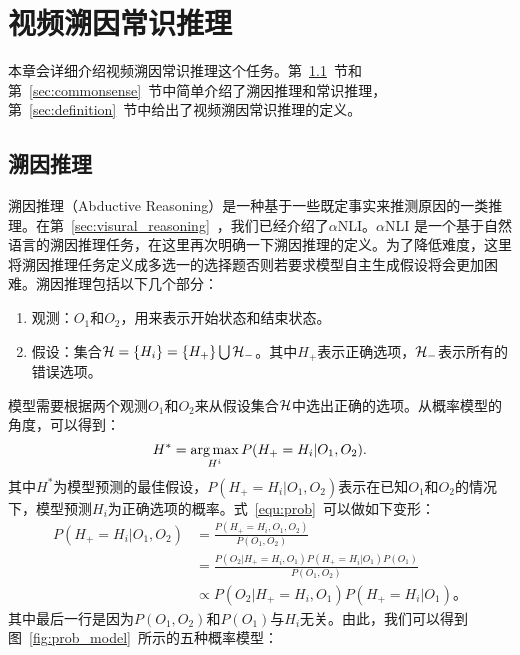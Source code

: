 
\chapter{视频溯因常识推理}\label{cha:vacr}
本章会详细介绍视频溯因常识推理这个任务。第~\ref{sec:abductive}~节和第~\ref{sec:commonsense}~节中简单介绍了溯因推理和常识推理，第~\ref{sec:definition}~节中给出了视频溯因常识推理的定义。
\section{溯因推理}\label{sec:abductive}
溯因推理（Abductive Reasoning）是一种基于一些既定事实来推测原因的一类推理。在第~\ref{sec:visural_reasoning}~，我们已经介绍了$\alpha$NLI\cite{bhagavatula2019abductive}。$\alpha$NLI 是一个基于自然语言的溯因推理任务，在这里再次明确一下溯因推理的定义。为了降低难度，这里将溯因推理任务定义成多选一的选择题否则若要求模型自主生成假设将会更加困难。溯因推理包括以下几个部分：
\begin{enumerate}
    \item 观测：$O_1$和$O_2$，用来表示开始状态和结束状态。
    \item 假设：集合${\mathcal{H}}=\{H_i\}=\{H_+\}\bigcup{\mathcal{H}}_{-}$。其中$H_+$表示正确选项，${\mathcal{H}}_-$表示所有的错误选项。
\end{enumerate}
模型需要根据两个观测$O_1$和$O_2$来从假设集合${\mathcal{H}}$中选出正确的选项。从概率模型的角度\cite{bhagavatula2019abductive}，可以得到：
\begin{equation}
    H^{*}=\operatorname*{arg\,max} _{H^{i}} P(H_+=H_i | O_{1}, O_{2}).
    \label{equ:prob}
\end{equation}
其中$H^*$为模型预测的最佳假设，$P(H_+=H_i|O_1, O_2)$表示在已知$O_1$和$O_2$的情况下，模型预测$H_i$为正确选项的概率。式~\eqref{equ:prob}~可以做如下变形：
\begin{equation}
    \begin{split}
        P(H_+=H_i | O_{1}, O_{2}) &= \frac{P(H_+=H_i, O_1, O_2)}{P(O_{1}, O_{2})} \\
        &= \frac{P(O_2|H_+=H_i, O_1)P(H_+=H_i|O_1)P(O_1)}{P(O_{1}, O_{2})}\\
        &\propto P(O_2|H_+=H_i, O_1)P(H_+=H_i|O_1)。
    \end{split}
    \label{equ:prob_model}
\end{equation}
其中最后一行是因为$P(O_1, O_2)$和$P(O_1)$与$H_i$无关。由此，我们可以得到图~\ref{fig:prob_model}~所示的五种概率模型：
